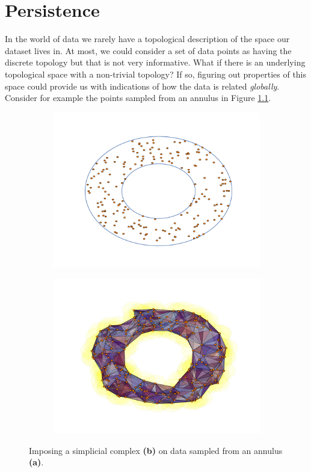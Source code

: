 \chapter{Persistence}
In the world of data we rarely have a topological description of the space our dataset lives in. At most, we could consider a set of data points as having the discrete topology but that is not very informative. What if there is an underlying topological space with a non-trivial topology? If so, figuring out properties of this space could provide us with indications of how the data is related \textit{globally}. Consider for example the points sampled from an annulus in Figure \ref{annulus:points}.

\begin{figure}[ht]
  \centering
  \begin{subfigure}[t]{.5\linewidth}
    \includegraphics[scale=.5]{annulus.pdf}
    \caption{\label{annulus:points}}
 \end{subfigure}%
  \begin{subfigure}[t]{.5\linewidth}
    \includegraphics[scale=.5]{annulus_rips.pdf}
    \caption{\label{annulus:imposed}}
 \end{subfigure}
  \caption{\label{annulus} Imposing a simplicial complex \textbf{(b)} on data sampled from an annulus \textbf{(a)}.}
\end{figure}


